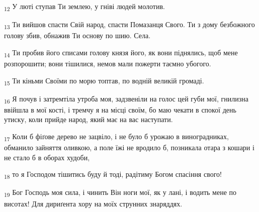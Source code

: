 \begin{tcolorbox}
\textsubscript{12} У люті ступав Ти землею, у гніві людей молотив.
\end{tcolorbox}
\begin{tcolorbox}
\textsubscript{13} Ти вийшов спасти Свій народ, спасти Помазанця Свого. Ти з дому безбожного голову збив, обнажив Ти основу по шию. Села.
\end{tcolorbox}
\begin{tcolorbox}
\textsubscript{14} Ти пробив його списами голову князя його, як вони піднялись, щоб мене розпорошити; вони тішилися, немов мали пожерти таємно убогого.
\end{tcolorbox}
\begin{tcolorbox}
\textsubscript{15} Ти кіньми Своїми по морю топтав, по водній великій громаді.
\end{tcolorbox}
\begin{tcolorbox}
\textsubscript{16} Я почув і затремтіла утроба моя, задзвеніли на голос цей губи мої, гнилизна ввійшла в мої кості, і тремчу я на місці своїм, бо маю чекати в спокої день утиску, коли прийде народ, який має на вас наступати.
\end{tcolorbox}
\begin{tcolorbox}
\textsubscript{17} Коли б фіґове дерево не зацвіло, і не було б урожаю в виноградниках, обманило зайняття оливкою, а поле їжі не вродило б, позникала отара з кошари і не стало б в оборах худоби,
\end{tcolorbox}
\begin{tcolorbox}
\textsubscript{18} то я Господом тішитись буду й тоді, радітиму Богом спасіння свого!
\end{tcolorbox}
\begin{tcolorbox}
\textsubscript{19} Бог Господь моя сила, і чинить Він ноги мої, як у лані, і водить мене по висотах! Для дириґента хору на моїх струнних знаряддях.
\end{tcolorbox}
